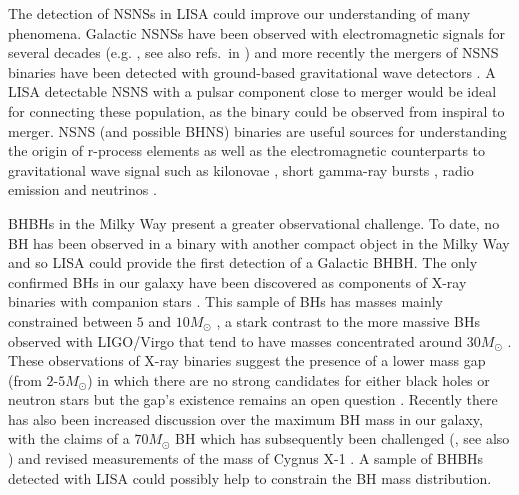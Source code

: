 The detection of NSNSs in LISA could improve our understanding of many phenomena. Galactic NSNSs have been observed with electromagnetic signals for several decades (e.g. \citealp{Hulse+1975}, see also refs.\ in \citealp{Tauris+2017,Vigna-Gomez+2018}) and more recently the mergers of NSNS binaries have been detected with ground-based gravitational wave detectors \citep[e.g.][]{Abbott+2017_NSNS}. A LISA detectable NSNS with a pulsar component close to merger would be ideal for connecting these population, as the binary could be observed from inspiral to merger. NSNS (and possible BHNS) binaries are useful sources for understanding the origin of r-process elements \citep[e.g.][]{Eichler+1989} as well as the electromagnetic counterparts to gravitational wave signal such as kilonovae \citep[e.g.][]{Li+1998, Metzger+2017}, short gamma-ray bursts \citep[e.g.][]{Berger+2014}, radio emission \citep[e.g.][]{Hotokezaka+2016} and neutrinos \citep[e.g.][]{Kyutoku+2018}.

BHBHs in the Milky Way present a greater observational challenge. To date, no BH has been observed in a binary with another compact object in the Milky Way and so LISA could provide the first detection of a Galactic BHBH. The only confirmed BHs in our galaxy have been discovered as components of X-ray binaries with companion stars \citep[e.g.][]{Bolton+1972,Webster+1972}. This sample of BHs has masses mainly constrained between $5$ and $10 \unit{M_\odot}$ \citep{Corral-Santana+2016}, a stark contrast to the more massive BHs observed with LIGO/Virgo that tend to have masses concentrated around $30 \unit{M_{\odot}}$ \citep{Abbott+2020_GWTC2}. These observations of X-ray binaries suggest the presence of a lower mass gap (from $2$-$5 \unit{M_{\odot}}$) in which there are no strong candidates for either black holes or neutron stars \citep{Ozel+2010,Farr+2011} but the gap's existence remains an open question \citep[e.g.][]{Kreidberg+2012, Mandel+2020}. Recently there has also been increased discussion over the maximum BH mass in our galaxy, with the claims of a $70 \unit{M_{\odot}}$ BH \citep{Liu+2019} which has subsequently been challenged (\citealp{El-Badry+2020, Abdul-Masih+2020, Shenar+2020,Eldridge+2020}, see also \citealp{Liu+2020}) and revised measurements of the mass of Cygnus X-1 \citep{Miller-Jones+2021}. A sample of BHBHs detected with LISA could possibly help to constrain the BH mass distribution.

